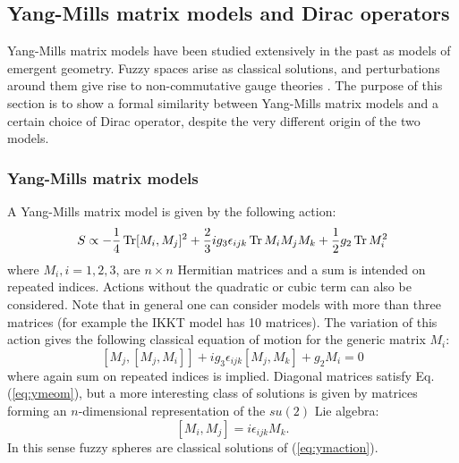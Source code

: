 \subsection{Yang-Mills matrix models and Dirac operators}\label{ymdo}
Yang-Mills matrix models have been studied extensively in the past \cite{ymnum1} \cite{ymnum2} \cite{ymnum3} \cite{ymnum4} as models of emergent geometry. Fuzzy spaces arise as classical solutions, and perturbations around them give rise to non-commutative gauge theories \cite{hareview}.\newline
The purpose of this section is to show a formal similarity between Yang-Mills matrix models and a certain choice of Dirac operator, despite the very different origin of the two models.\newline

\subsubsection{Yang-Mills matrix models}
A Yang-Mills matrix model is given by the following action:
\begin{equation}\label{eq:ymaction}
S \propto -\frac{1}{4} \operatorname{Tr} [M_i, M_j]^2 + \frac{2}{3} i g_3 \epsilon_{ijk} \operatorname{Tr} M_i M_j M_k + \frac{1}{2} g_2 \operatorname{Tr} M_i^2
\end{equation}
where $M_i, i=1,2,3$, are $n \times n$ Hermitian matrices and a sum is intended on repeated indices. Actions without the quadratic or cubic term can also be considered. Note that in general one can consider models with more than three matrices (for example the IKKT model \cite{ikkt} has 10 matrices).\newline
The variation of this action gives the following classical equation of motion for the generic matrix $M_i$:
\begin{equation}\label{eq:ymeom}
[M_j, [M_j, M_i]] + i g_3 \epsilon_{ijk}[M_j, M_k] + g_2 M_i = 0
\end{equation}
where again sum on repeated indices is implied. Diagonal matrices satisfy Eq.(\ref{eq:ymeom}), but a more interesting class of solutions is given by matrices forming an $n$-dimensional representation of the $su(2)$ Lie algebra:
\begin{equation}\label{eq:ymsol}
[M_i, M_j] = i \epsilon_{ijk} M_k.
\end{equation}
In this sense fuzzy spheres are classical solutions of (\ref{eq:ymaction}).


